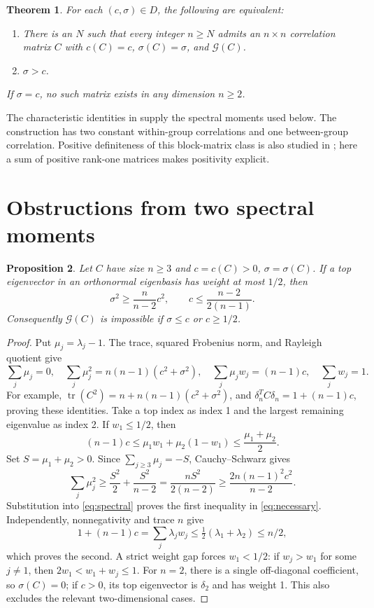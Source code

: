 \documentclass[11pt]{article}
\newtheorem{theorem}{Theorem}
\newtheorem{proposition}[theorem]{Proposition}
\newcommand{\G}{\mathcal G}
\begin{document}
\begin{samepage}
\begin{theorem}\label{thm:question}
For each $(c,\sigma)\in D$, the following are equivalent:
\begin{enumerate}
\item There is an $N$ such that every integer $n\ge N$ admits an
$n\times n$ correlation matrix $C$ with
$c(C)=c$, $\sigma(C)=\sigma$, and $\G(C)$.
\item $\sigma>c$.
\end{enumerate}
If $\sigma=c$, no such matrix exists in any dimension $n\ge2$.
\end{theorem}
\end{samepage}

The characteristic identities in \cite[Lemma II.5]{SHG} supply the
spectral moments used below. The construction has two constant
within-group correlations and one between-group correlation. Positive
definiteness of this block-matrix class is also studied in \cite{RD};
here a sum of positive rank-one matrices makes positivity explicit.

\section{Obstructions from two spectral moments}
\begin{proposition}\label{prop:obstruction}
Let $C$ have size $n\ge3$ and $c=c(C)>0$, $\sigma=\sigma(C)$.
If a top eigenvector in an orthonormal eigenbasis has weight at most
$1/2$, then
\begin{equation}\label{eq:necessary}
 \sigma^2\ge\frac{n}{n-2}c^2,\qquad
 c\le\frac{n-2}{2(n-1)}.
\end{equation}
Consequently $\G(C)$ is impossible if $\sigma\le c$ or $c\ge1/2$.
\end{proposition}
\begin{proof}
Put $\mu_j=\lambda_j-1$. The trace, squared Frobenius norm, and
Rayleigh quotient give
\begin{equation}\label{eq:spectral}
 \sum_j\mu_j=0,\quad
 \sum_j\mu_j^2=n(n-1)(c^2+\sigma^2),\quad
 \sum_j\mu_jw_j=(n-1)c,\quad \sum_jw_j=1.
\end{equation}
For example, $\operatorname{tr}(C^2)=n+n(n-1)(c^2+\sigma^2)$,
and $\delta_n^TC\delta_n=1+(n-1)c$, proving these identities.
Take a top index as index 1 and the largest remaining eigenvalue as
index 2. If $w_1\le1/2$, then
\[
 (n-1)c\le\mu_1w_1+\mu_2(1-w_1)
 \le\frac{\mu_1+\mu_2}{2}.
\]
Set $S=\mu_1+\mu_2>0$. Since $\sum_{j\ge3}\mu_j=-S$,
Cauchy--Schwarz gives
\[
 \sum_j\mu_j^2\ge\frac{S^2}{2}+\frac{S^2}{n-2}
 =\frac{nS^2}{2(n-2)}
 \ge\frac{2n(n-1)^2c^2}{n-2}.
\]
Substitution into \eqref{eq:spectral} proves the first inequality
in \eqref{eq:necessary}. Independently, nonnegativity and trace $n$
give
\[
 1+(n-1)c=\sum_j\lambda_jw_j
 \le\tfrac12(\lambda_1+\lambda_2)\le n/2,
\]
which proves the second. A strict weight gap forces $w_1<1/2$:
if $w_j>w_1$ for some $j\ne1$, then $2w_1<w_1+w_j\le1$.
For $n=2$, there is a single off-diagonal coefficient, so
$\sigma(C)=0$; if $c>0$, its top eigenvector is $\delta_2$ and has
weight 1. This also excludes the relevant two-dimensional cases.
\end{proof}
\end{document}
